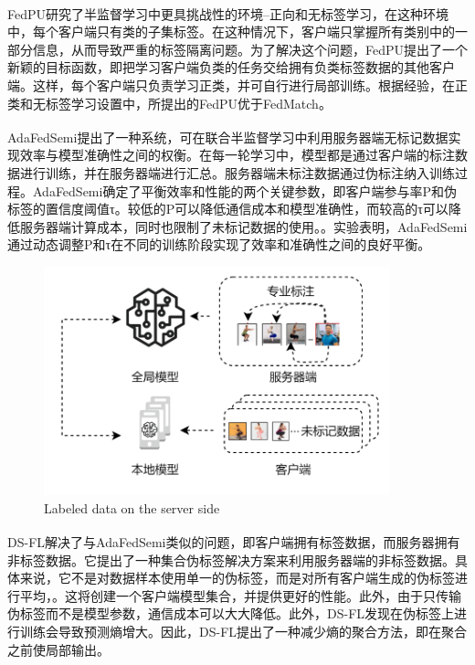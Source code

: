 FedPU\textsuperscript{\cite{lin2022federated}}研究了半监督学习中更具挑战性的环境--正向和无标签学习，在这种环境中，每个客户端只有类的子集标签。在这种情况下，客户端只掌握所有类别中的一部分信息，从而导致严重的标签隔离问题。为了解决这个问题，FedPU提出了一个新颖的目标函数，即把学习客户端负类的任务交给拥有负类标签数据的其他客户端。这样，每个客户端只负责学习正类，并可自行进行局部训练。根据经验，在正类和无标签学习设置中，所提出的FedPU优于FedMatch。

AdaFedSemi\textsuperscript{\cite{wang2022enhancing}}提出了一种系统，可在联合半监督学习中利用服务器端无标记数据实现效率与模型准确性之间的权衡。在每一轮学习中，模型都是通过客户端的标注数据进行训练，并在服务器端进行汇总。服务器端未标注数据通过伪标注纳入训练过程。AdaFedSemi确定了平衡效率和性能的两个关键参数，即客户端参与率P和伪标签的置信度阈值τ。较低的P可以降低通信成本和模型准确性，而较高的τ可以降低服务器端计算成本，同时也限制了未标记数据的使用。。实验表明，AdaFedSemi通过动态调整P和τ在不同的训练阶段实现了效率和准确性之间的良好平衡。
\vspace{-0.1cm}
\begin{figure}[!htbp]
	\centering
	\includegraphics[width=10cm]{chapters/imgs/LabelAtServer}
	{\wuhao Labeled data on the server side}
	\label{LabelAtServer}
\end{figure}
\vspace{-0.35cm}
DS-FL\textsuperscript{\cite{itahara2021distillation}}解决了与AdaFedSemi类似的问题，即客户端拥有标签数据，而服务器拥有非标签数据。它提出了一种集合伪标签解决方案来利用服务器端的非标签数据。具体来说，它不是对数据样本使用单一的伪标签，而是对所有客户端生成的伪标签进行平均，。这将创建一个客户端模型集合，并提供更好的性能。此外，由于只传输伪标签而不是模型参数，通信成本可以大大降低。此外，DS-FL发现在伪标签上进行训练会导致预测熵增大。因此，DS-FL提出了一种减少熵的聚合方法，即在聚合之前使局部输出。

